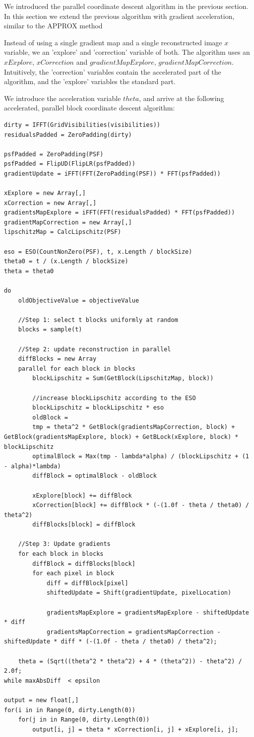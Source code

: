 We introduced the parallel coordinate descent algorithm in the previous section. In this section we extend the previous algorithm with gradient acceleration, similar to the APPROX method 

Instead of using a single gradient map and a single reconstructed image $x$ variable, we an 'explore' and 'correction' variable of both. The algorithm uses an $xExplore$,  $xCorrection$ and $gradientMapExplore$, $gradientMapCorrection$. Intuitively, the 'correction' variables contain the accelerated part of the algorithm, and the 'explore' variables the standard part.

We introduce the acceleration variable $theta$, and arrive at the following accelerated, parallel block coordinate descent algorithm:
\begin{lstlisting}
dirty = IFFT(GridVisibilities(visibilities))
residualsPadded = ZeroPadding(dirty)

psfPadded = ZeroPadding(PSF)
psfPadded = FlipUD(FlipLR(psfPadded))
gradientUpdate = iFFT(FFT(ZeroPadding(PSF)) * FFT(psfPadded))

xExplore = new Array[,]
xCorrection = new Array[,]
gradientsMapExplore = iFFT(FFT(residualsPadded) * FFT(psfPadded))
gradientMapCorrection = new Array[,]
lipschitzMap = CalcLipschitz(PSF)

eso = ESO(CountNonZero(PSF), t, x.Length / blockSize)
theta0 = t / (x.Length / blockSize)
theta = theta0

do 
	oldObjectiveValue = objectiveValue
	
	//Step 1: select t blocks uniformly at random
	blocks = sample(t)
	
	//Step 2: update reconstruction in parallel
	diffBlocks = new Array
	parallel for each block in blocks
		blockLipschitz = Sum(GetBlock(LipschitzMap, block))
		
		//increase blockLipschitz according to the ESO
		blockLipschitz = blockLipschitz * eso
		oldBlock = 
		tmp = theta^2 * GetBlock(gradientsMapCorrection, block) + GetBlock(gradientsMapExplore, block) + GetBLock(xExplore, block) * blockLipschitz
		optimalBlock = Max(tmp - lambda*alpha) / (blockLipschitz + (1 - alpha)*lambda)
		diffBlock = optimalBlock - oldBlock
		
		xExplore[block] += diffBlock
		xCorrection[block] += diffBlock * (-(1.0f - theta / theta0) / theta^2)
		diffBlocks[block] = diffBlock
	
	//Step 3: Update gradients
	for each block in blocks
		diffBlock = diffBlocks[block]
		for each pixel in block
			diff = diffBlock[pixel]
			shiftedUpdate = Shift(gradientUpdate, pixelLocation)
			
			gradientsMapExplore = gradientsMapExplore - shiftedUpdate * diff
			gradientsMapCorrection = gradientsMapCorrection - shiftedUpdate * diff * (-(1.0f - theta / theta0) / theta^2);
	
	theta = (Sqrt((theta^2 * theta^2) + 4 * (theta^2)) - theta^2) / 2.0f;
while maxAbsDiff  < epsilon

output = new float[,]
for(i in in Range(0, dirty.Length(0))
	for(j in in Range(0, dirty.Length(0))
		output[i, j] = theta * xCorrection[i, j] + xExplore[i, j];
\end{lstlisting}

